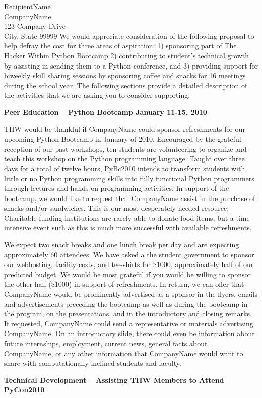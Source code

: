 \documentclass{letter}
\begin{document}
\begin{letter}{RecipientName\\
CompanyName\\
123 Company Drive\\
City, State 99999
}
We would appreciate consideration of the following proposal to help defray the cost for three areas of aspiration: 1) sponsoring part of The Hacker Within Python Bootcamp 2) contributing to student's technical growth by assisting in sending them to a Python conference, and 3) providing support for biweekly skill sharing sessions by sponsoring coffee and snacks for 16 meetings during the school year.  The following sections provide a detailed description of the activities that we are asking you to consider supporting.

\textbf{Peer Education – Python Bootcamp January 11-15, 2010}

THW would be thankful if CompanyName could sponsor refreshments for our upcoming Python Bootcamp in January of 2010. Encouraged by the grateful reception of our past workshops, ten students are volunteering to organize and teach this workshop on the Python programming language. Taught over three days for a total of twelve hours, PyBc2010 intends to transform students with little or no Python programming skills into fully functional Python programmers through lectures and hands on programming activities. In support of the bootcamp, we would like to request that CompanyName assist in the purchase of snacks and/or sandwiches. This is our most desperately needed resource. Charitable funding institutions are rarely able to donate food-items, but a time-intensive event such as this is much more successful with available refreshments. 

We expect two snack breaks and one lunch break per day and are expecting approximately 60 attendees. We have asked a the student government to sponsor our webhosting, facility costs, and tee-shirts for \$1000, approximately half of our predicted budget. We would be most grateful if you would be willing to sponsor the other half (\$1000) in support of refreshments. In return, we can offer that CompanyName would be prominently advertised as a sponsor in the flyers, emails and advertisements preceding the bootcamp as well as during the bootcamp in the program, on the presentations, and in the introductory and closing remarks. If requested, CompanyName could send a representative or materials advertising CompanyName. On an introductory slide, there could even be information about future internships, employment, current news, general facts about CompanyName, or any other information that CompanyName would want to share with computationally inclined students and faculty.

\textbf{Technical Development – Assisting THW Members to Attend PyCon2010}


\end{letter}
\end{document}

